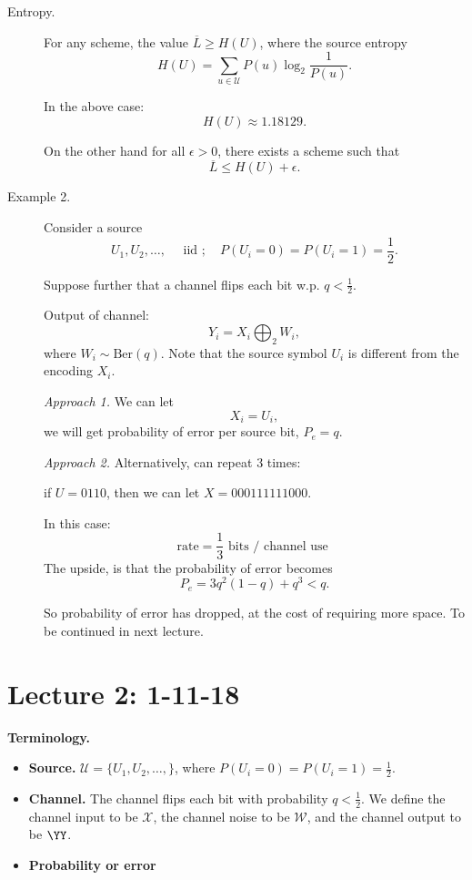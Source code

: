 \documentclass[13pt]{article}
\newcommand{\UU}{\mathcal{U}}
\def\UU{\mathcal{U}}
\def\WW{\mathcal{W}}
\def\XX{\mathcal{X}}
\begin{document}
\begin{description}
  \item[Entropy.] For any scheme, the value $\overline{L} \geq H(U)$, where the source entropy
    \[
      H(U) = \sum_{u \in \mathcal{U}} P(u) \log_2 \frac{1}{P(u)}.
    \]

    In the above case:
    \[
    H(U) \approx 1.18129.
    \]

    On the other hand for all $\epsilon > 0$, there exists a scheme such that
    \[
      \overline{L} \leq H(U) + \epsilon.
    \]

  \item[Example 2.] Consider a source
    \[
      U_1, U_2, \dots, \quad \text{ iid }; \quad P(U_i = 0) = P(U_i = 1) = \frac{1}{2}.
    \]

    Suppose further that a channel flips each bit w.p. $q < \frac{1}{2}$.

    Output of channel:
    \[
      Y_i = X_i \bigoplus_2 W_i,
    \]
    where $W_i \sim \text{Ber}(q)$.  Note that the source symbol $U_i$ is different from the encoding $X_i$.

    {\it Approach 1.} We can let
    \[
      X_i = U_i,
    \]
    we will get probability of error per source bit, $P_e = q$.

    {\it Approach 2.} Alternatively, can repeat $3$ times:

    if $U = 0 1 1 0$, then we can let $X = 000 111 111 000$.

    In this case:
    \[
      \text{rate} = \frac{1}{3} \text{ bits / channel use }
    \]
    The upside, is that the probability of error becomes
    \[
      P_e = 3 q^2 (1-q) + q^3 < q.
    \]

    So probability of error has dropped, at the cost of requiring more space.  To be continued in next lecture.

\end{description}

\section{Lecture 2: 1-11-18}

{\bf Terminology.} 

\begin{itemize}
  \item {\bf Source.} $\UU = \{ U_1, U_2, \dots, \}$, where $P(U_i = 0) = P(U_i = 1) = \frac{1}{2}$.
  \item {\bf Channel.} The channel flips each bit with probability $q < \frac{1}{2}$.  We define the channel input to be $\XX$, the channel noise to be $\WW$, and the channel output to be $\YY$. 
  \item {\bf Probability or error } 

\end{itemize}
\end{document}
